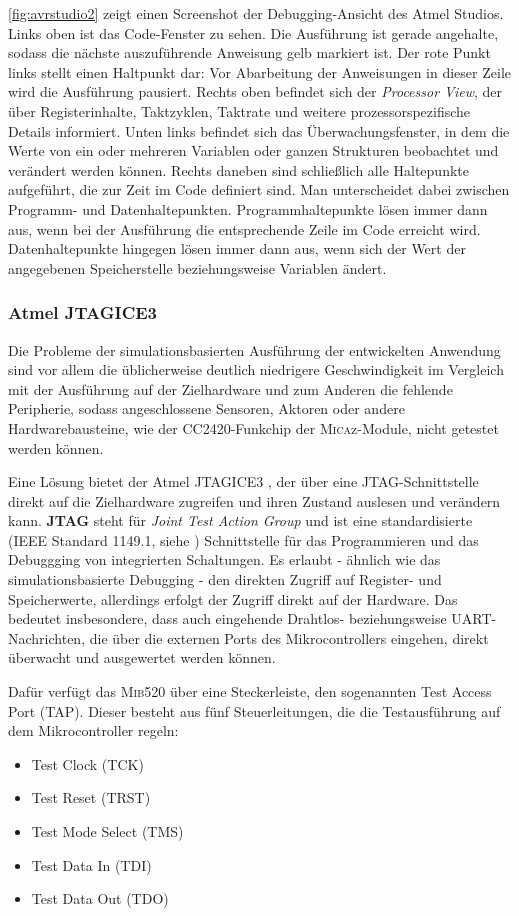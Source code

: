 \autoref{fig:avrstudio2} zeigt einen Screenshot der Debugging-Ansicht des Atmel Studios. Links oben ist das Code-Fenster zu sehen. Die Ausführung ist gerade angehalte, sodass die nächste auszuführende Anweisung gelb markiert ist. Der rote Punkt links stellt einen Haltpunkt dar: Vor Abarbeitung der Anweisungen in dieser Zeile wird die Ausführung pausiert. Rechts oben befindet sich der \textit{Processor View}, der über Registerinhalte, Taktzyklen, Taktrate und weitere prozessorspezifische Details informiert. Unten links befindet sich das Überwachungsfenster, in dem die Werte von ein oder mehreren Variablen oder ganzen Strukturen beobachtet und verändert werden können. Rechts daneben sind schließlich alle Haltepunkte aufgeführt, die zur Zeit im Code definiert sind. Man unterscheidet dabei zwischen Programm- und Datenhaltepunkten. Programmhaltepunkte lösen immer dann aus, wenn bei der Ausführung die entsprechende Zeile im Code erreicht wird. Datenhaltepunkte hingegen lösen immer dann aus, wenn sich der Wert der angegebenen Speicherstelle beziehungsweise Variablen ändert.

\subsubsection{Atmel JTAGICE3}
\label{sec:JTAGICE3}
Die Probleme der simulationsbasierten Ausführung der entwickelten Anwendung sind vor allem die üblicherweise deutlich niedrigere Geschwindigkeit im Vergleich mit der Ausführung auf der Zielhardware und zum Anderen die fehlende Peripherie, sodass angeschlossene Sensoren, Aktoren oder andere Hardwarebausteine, wie der CC2420-Funkchip der \textsc{Mica}z-Module, nicht getestet werden können.

Eine Lösung bietet der Atmel JTAGICE3 \cite{AtmelJTAGICE3:2014:Online}, der über eine JTAG-Schnittstelle direkt auf die Zielhardware zugreifen und ihren Zustand auslesen und verändern kann. \textbf{JTAG} steht für \textit{Joint Test Action Group} und ist eine standardisierte (IEEE Standard 1149.1, siehe \cite{IEEE1149:2014:Online}) Schnittstelle für das Programmieren und das Debuggging von integrierten Schaltungen. Es erlaubt - ähnlich wie das simulationsbasierte Debugging - den direkten Zugriff auf Register- und Speicherwerte, allerdings erfolgt der Zugriff direkt auf der Hardware. Das bedeutet insbesondere, dass auch eingehende Drahtlos- beziehungsweise UART-Nachrichten, die über die externen Ports des Mikrocontrollers eingehen, direkt überwacht und ausgewertet werden können.

Dafür verfügt das \textsc{Mib}520 über eine Steckerleiste, den sogenannten Test Access Port (TAP). Dieser besteht aus fünf Steuerleitungen, die die Testausführung auf dem Mikrocontroller regeln:
\begin{itemize}
\item Test Clock (TCK)
\item Test Reset (TRST)
\item Test Mode Select (TMS)
\item Test Data In (TDI)
\item Test Data Out (TDO)
\end{itemize}

